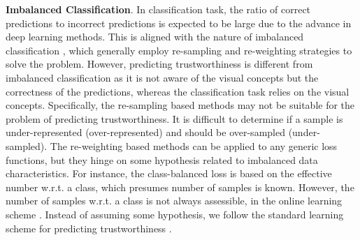 
\noindent\textbf{Imbalanced Classification}.
In classification task, the ratio of correct predictions to incorrect predictions is expected to be large due to the advance in deep learning methods.
This is aligned with the nature of imbalanced classification \cite{Huang_CVPR_2016,Wang_CVPR_2019,Cao_NIPS_2019,Cui_CVPR_2019,Kim_CVPR_2020}, which generally employ re-sampling and re-weighting strategies to solve the problem.
However, predicting trustworthiness is different from imbalanced classification as it is not aware of the visual concepts but the correctness of the predictions, whereas the classification task relies on the visual concepts.
Specifically, the re-sampling based methods \cite{Huang_CVPR_2016,Wang_CVPR_2019,Kim_CVPR_2020} may not be suitable for the problem of predicting trustworthiness.
It is difficult to determine if a sample is under-represented (over-represented) and should be over-sampled (under-sampled).
The re-weighting based methods \cite{Wang_CVPR_2019,Cui_CVPR_2019} can be applied to any generic loss functions, but they hinge on some hypothesis related to imbalanced data characteristics.
For instance, the class-balanced loss \cite{Cui_CVPR_2019} is based on the effective number w.r.t. a class, which presumes number of samples is known.
However, the number of samples w.r.t. a class is not always assessible, \eg in the online learning scheme \cite{Crammer_NIPS_2004,Bechavod_NIPS_2020}.
Instead of assuming some hypothesis, we follow the standard learning scheme for predicting trustworthiness \cite{Jiang_NIPS_2018,Corbiere_NIPS_2019}.